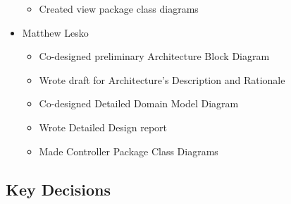 \documentclass[12pt]{article}
\begin{document}
\begin{itemize}
\begin{itemize}
        \item Created view package class diagrams
    \end{itemize}
    \item Matthew Lesko
    \begin{itemize}
        \item Co-designed preliminary Architecture Block Diagram
        \item Wrote draft for Architecture's Description and Rationale
        \item Co-designed Detailed Domain Model Diagram
        \item Wrote Detailed Design report
        \item Made Controller Package Class Diagrams
    \end{itemize}
\end{itemize}

\subsection{Key Decisions}
\end{document}
